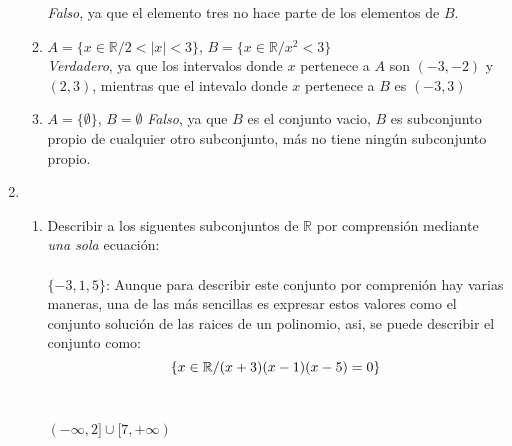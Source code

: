 \documentclass[a4paper,11pt]{article}
\newcommand{\real}{\mathbb{R}}
\begin{document}
\begin{enumerate}
\begin{enumerate}[label = \roman*)]
                    \textit{Falso}, ya que el elemento tres no hace parte de los elementos de $B$.
                \item $A=\{x\in \mathbb{R}/2<|x|<3\}$, $B=\{x\in \mathbb{R}/x^{2}<3\}$\\
                    \textit{Verdadero}, ya que los intervalos donde $x$ pertenece a $A$ son $(-3,-2)$ y $(2,3)$, mientras que el intevalo donde $x$ pertenece a $B$ es $(-3,3)$
                \item $A=\{\emptyset\}$, $B=\emptyset$
                    \textit{Falso}, ya que $B$ es el conjunto vacio, $B$ es subconjunto propio de cualquier otro subconjunto, m\'as no tiene ning\'un subconjunto propio.
            \end{enumerate}
        \item 
        \begin{enumerate}[label = \roman*)]
            \item Describir a los siguentes subconjuntos de $\real$ por comprensi\'on mediante \textit{una sola} ecuaci\'on:\\\\
            $\{-3,1,5\}$: 
            Aunque para describir este conjunto por compreni\'on hay varias maneras, una de las m\'as sencillas es expresar estos valores como el conjunto soluci\'on de las raices de un polinomio, asi, se puede describir el conjunto como:
            \begin{equation}
                \notag \{x\in \mathbb{R}/(x+3)(x-1)(x-5)=0\}
            \end{equation}
            \\\\
            $(-\infty,2]\cup[7,+\infty)$
        \end{enumerate}
    \end{enumerate}
\end{document}
